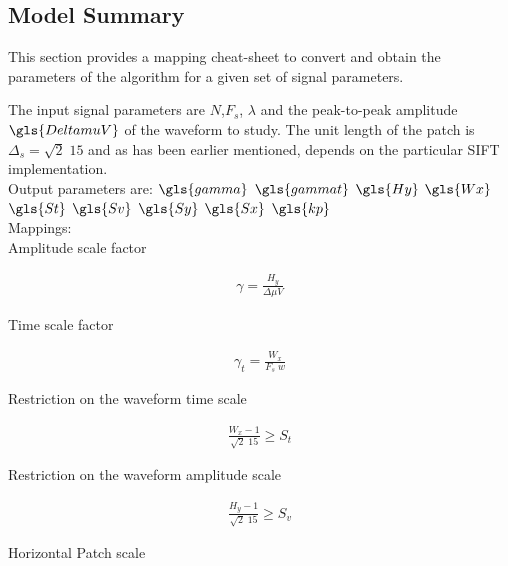 \begin{subappendices}

\section{Model Summary}

This section provides a mapping cheat-sheet to convert and obtain the parameters of the algorithm for a given set of signal parameters.

The input signal parameters are $N$,$F_s$, $\lambda$ and the peak-to-peak amplitude $\gls{DeltamuV}$ of the waveform to study. The unit length of the patch is $\Delta_s = \sqrt{2} \; 15$ and as has been earlier mentioned, depends on the particular SIFT implementation.\\


Output parameters are: 
$\gls{gamma}$
$\gls{gammat}$
$\gls{Hy}$
$\gls{Wx}$
$\gls{St}$
$\gls{Sv}$
$\gls{Sy}$
$\gls{Sx}$
$\gls{kp}$\\

Mappings:\\

Amplitude scale factor

\begin{align*}
\gamma = \frac{H_y}{\Delta \mu V}  
\end{align*}

Time scale factor

\begin{align*}
\gamma_t = \frac{W_x}{F_s \; w}  
\end{align*}

%

Restriction on the waveform time scale

\begin{align*}
\frac{W_x-1}{\sqrt{2} \; 15}  \geq S_t 
\end{align*}

Restriction on the waveform amplitude scale

\begin{align*}
\frac{H_y-1}{\sqrt{2} \; 15}  \geq S_v 
\end{align*}

Horizontal Patch scale


\end{subappendices}
